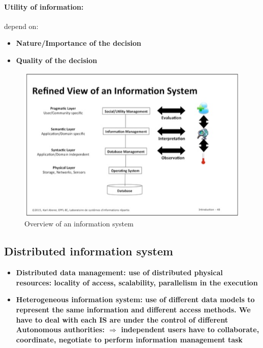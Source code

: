 \paragraph{Utility of information:} depend on:
\begin{itemize}
	\item \bf{Nature/Importance} of the decision
	\item \bf{Quality} of the decision
\end{itemize}

\begin{figure}[!ht]
\begin{center}
\includegraphics[width=1\linewidth]{figures/viewIS.jpg}
\end{center}
\caption{Overview of an information system}
\end{figure}

\subsection{Distributed information system}
\begin{itemize}
	\item \bf{Distributed data management:} use of distributed physical resources: locality of access, scalability, parallelism in the execution
	\item \bf{Heterogeneous information system:} use of different data models to represent the same information and different access methods. We have to deal with each IS are under the control of different \bf{Autonomous authorities:} $\Rightarrow$ independent users have to collaborate, coordinate, negotiate to perform information management task
\end{itemize}

